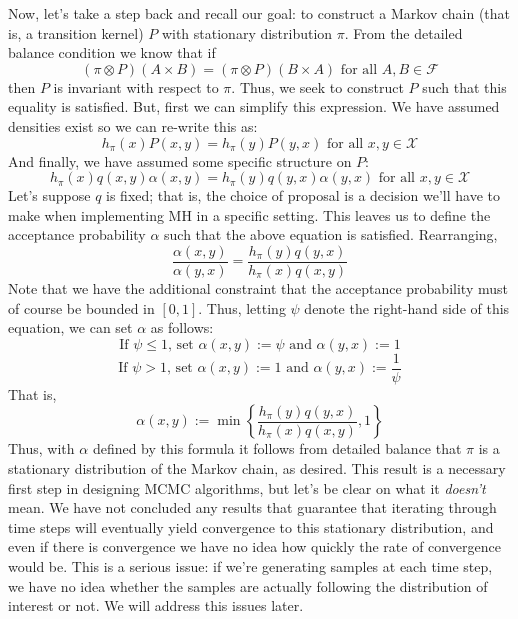 \documentclass[12pt]{article}
\begin{document}
Now, let's take a step back and recall our goal: to construct a Markov chain (that is, a transition kernel) $P$ with stationary distribution $\pi$. From the detailed balance 
condition we know that if
\[(\pi \otimes P)(A \times B) = (\pi \otimes P)(B \times A) \text{ for all } A, B \in \mathcal{F}\]
then $P$ is invariant with respect to $\pi$. Thus, we seek to construct $P$ such that this equality is satisfied. But, first we can simplify this expression. We have 
assumed densities exist so we can re-write this as: 
\[h_\pi (x)P(x, y) = h_\pi (y)P(y, x) \text{ for all } x, y \in \mathcal{X}\]
And finally, we have assumed some specific structure on $P$: 
\[h_\pi (x)q(x, y)\alpha(x, y)= h_\pi (y)q(y, x)\alpha(y, x) \text{ for all } x, y \in \mathcal{X}\]
Let's suppose $q$ is fixed; that is, the choice of proposal is a decision we'll have to make when implementing MH in a specific setting. This leaves us to 
define the acceptance probability $\alpha$ such that the above equation is satisfied. Rearranging, 
\[\frac{\alpha(x, y)}{\alpha(y, x)} = \frac{h_\pi(y)q(y, x)}{h_\pi(x)q(x, y)}\]
Note that we have the additional constraint that the acceptance probability must of course be bounded in $[0, 1]$. Thus, letting $\psi$ denote the right-hand side 
of this equation, we can set $\alpha$ as follows:
\[\text{If } \psi \leq 1 \text{, set } \alpha(x, y) := \psi \text{ and } \alpha(y, x) := 1\]
\[\text{If } \psi > 1 \text{, set } \alpha(x, y) := 1 \text{ and } \alpha(y, x) := \frac{1}{\psi}\]
That is, 
\[\alpha(x, y) := \min\left\{\frac{h_\pi(y) q(y, x)}{h_\pi(x)q(x, y)}, 1\right\}\]
Thus, with $\alpha$ defined by this formula it follows from detailed balance that $\pi$ is a stationary distribution of the Markov chain, as desired. This result is a necessary 
first step in designing MCMC algorithms, but let's be clear on what it \textit{doesn't} mean. We have not concluded any results that guarantee that iterating through time 
steps will eventually yield convergence to this stationary distribution, and even if there is convergence we have no idea how quickly the rate of convergence would be. This 
is a serious issue: if we're generating samples at each time step, we have no idea whether the samples are actually following the distribution of interest or not. We will address
this issues later.
\end{document}

